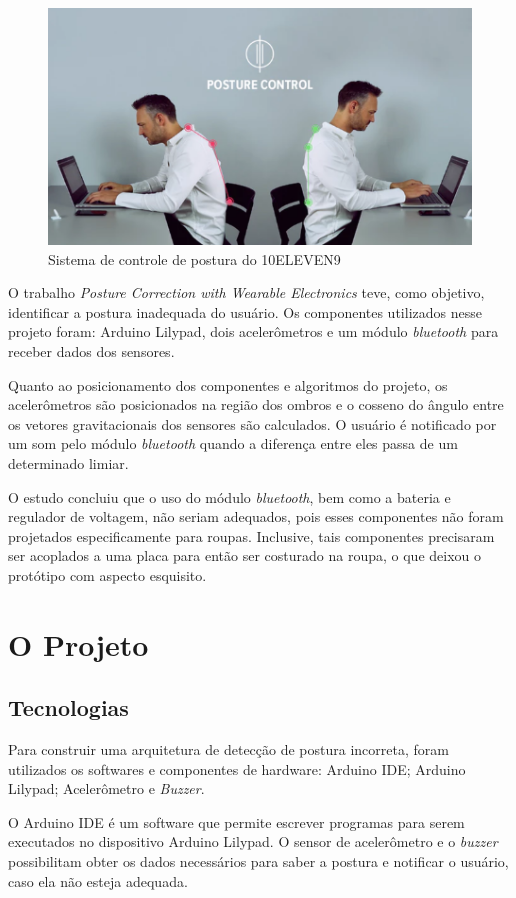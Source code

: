 \documentclass[12pt]{article}
\begin{document}
\begin{figure}[ht]
\centering
\includegraphics[width=.6\textwidth]{fig2.png}
\caption{Sistema de controle de postura do 10ELEVEN9}
\label{fig:example2}
\end{figure}

O trabalho \textit{Posture Correction with Wearable Electronics} \cite{rubow:08} teve, como objetivo, identificar a postura inadequada do usuário. Os componentes utilizados nesse projeto foram: Arduino Lilypad, dois acelerômetros e um módulo \textit{bluetooth} para receber dados dos sensores.

Quanto ao posicionamento dos componentes e algoritmos do projeto, os acelerômetros são posicionados na região dos ombros e o cosseno do ângulo entre os vetores gravitacionais dos sensores são calculados. O usuário é notificado por um som pelo módulo \textit{bluetooth} quando a diferença entre eles passa de um determinado limiar.

O estudo concluiu que o uso do módulo \textit{bluetooth}, bem como a bateria e regulador de voltagem, não seriam adequados, pois esses componentes não foram projetados especificamente para roupas. Inclusive, tais componentes precisaram ser acoplados a uma placa para então ser costurado na roupa, o que deixou o protótipo com aspecto esquisito.

\section{O Projeto}

\subsection{Tecnologias}

Para construir uma arquitetura de detecção de postura incorreta, foram utilizados os softwares e componentes de hardware: Arduino IDE; Arduino Lilypad; Acelerômetro e \textit{Buzzer}.

O Arduino IDE é um software que permite escrever programas para serem executados no dispositivo Arduino Lilypad. O sensor de acelerômetro e o \textit{buzzer} possibilitam obter os dados necessários para saber a postura e notificar o usuário, caso ela não esteja adequada.
\end{document}
